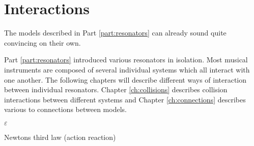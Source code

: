 \chapter*{Interactions}
The models described in Part \ref{part:resonators} can already sound quite convincing on their own. 

Part \ref{part:resonators} introduced various resonators in isolation. Most musical instruments are composed of several individual systems which all interact with one another. The following chapters will describe different ways of interaction between individual resonators. Chapter \ref{ch:collisions} describes collision interactions between different systems and Chapter \ref{ch:connections} describes various to connections between models.

$\varepsilon$

Newtons third law (action reaction)
